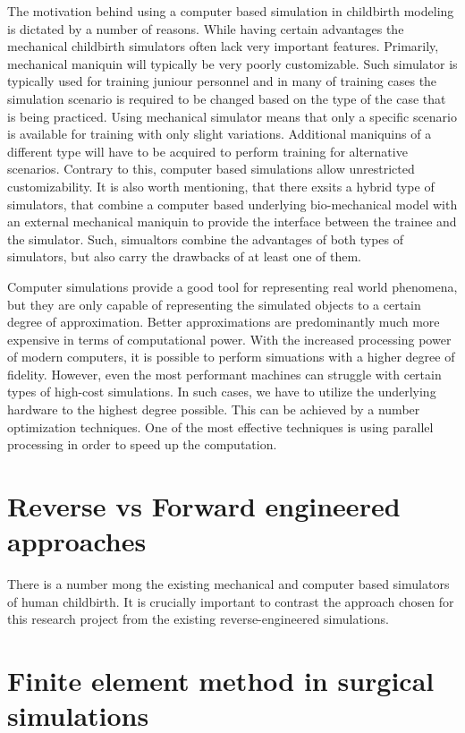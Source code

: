 The motivation behind using a computer based simulation in childbirth modeling is dictated by a number of reasons. While having certain advantages the mechanical childbirth simulators often lack very important features. Primarily, mechanical maniquin will typically be very poorly customizable. Such simulator is typically used for training juniour personnel and in many of training cases the simulation scenario is required to be changed based on the type of the case that is being practiced. Using mechanical simulator means that only a specific scenario is available for training with only slight variations. Additional maniquins of a different type will have to be acquired to perform training for alternative scenarios. Contrary to this, computer based simulations allow unrestricted customizability. It is also worth mentioning, that there exsits a hybrid type of simulators, that combine a computer based underlying bio-mechanical model with an external mechanical maniquin to provide the interface between the trainee and the simulator. Such, simualtors combine the advantages of both types of simulators, but also carry the drawbacks of at least one of them.

Computer simulations provide a good tool for representing real world phenomena, but they are only capable of representing the simulated objects to a certain degree of approximation. Better approximations are predominantly much more expensive in terms of computational power. With the increased processing power of modern computers, it is possible to perform simuations with a higher degree of fidelity. However, even the most performant machines can struggle with certain types of high-cost simulations. In such cases, we have to utilize the underlying hardware to the highest degree possible. This can be achieved by a number optimization techniques. One of the most effective techniques is using parallel processing in order to speed up the computation.

\section{Reverse vs Forward engineered approaches}

There is a number mong the existing mechanical and computer based simulators of human childbirth. It is crucially important to contrast the approach chosen for this research project from the existing reverse-engineered simulations.

\section{Finite element method in surgical simulations}

